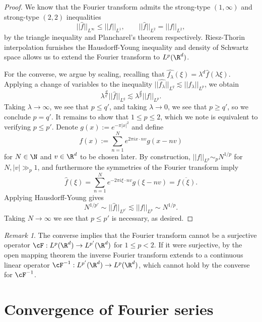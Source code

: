\documentclass[reqno]{amsart}
\theoremstyle{definition}
\theoremstyle{remark}
\newtheorem*{remark}{Remark}
\begin{document}
\begin{proof}
	We know that the Fourier transform admits the strong-type $(1, \infty)$ and strong-type $(2, 2)$ inequalities
		\[ ||\widehat f ||_{L^\infty} \leq ||f||_{L^1}, \qquad ||\widehat f||_{L^2} = ||f||_{L^2}, \]
	by the triangle inequality and Plancharel's theorem respectively. Riesz-Thorin interpolation furnishes the Hausdorff-Young inequality and density of Schwartz space allows us to extend the Fourier transform to $L^p (\R^d)$. 
	
	For the converse, we argue by scaling, recalling that $\widehat{f_\lambda} (\xi) = \lambda^d \widehat f (\lambda \xi)$. Applying a change of variables to the inequality $||\widehat{f_\lambda}||_{L^q} \lesssim ||f_\lambda||_{L^p}$, we obtain
		\[ \lambda^{\frac{d}{q'}} ||\widehat f||_{L^q}  \lesssim \lambda^{\frac{d}{p}} ||f||_{L^p}. \]
	Taking $\lambda \to \infty$, we see that $p \leq q'$, and taking $\lambda \to 0$, we see that $p \geq q'$, so we conclude $p = q'$. It remains to show that $1 \leq p \leq 2$, which we note is equivalent to verifying $p \leq p'$. Denote $g(x) := e^{-\pi |x|^2}$ and define
		\[ f(x) := \sum_{n = 1}^N e^{2\pi i x \cdot nv} g(x - n v) \]
	for $N \in \N$ and $v \in \R^d$ to be chosen later. By construction, $||f||_{L^p} \sim_p N^{1/p}$ for $N, |v| \gg_p 1$, and furthermore the symmetries of the Fourier transform imply
		\[ \widehat f(\xi) = \sum_{n = 1}^N e^{-2 \pi i \xi \cdot n v} g(\xi - nv) = \overline{f(\xi)}. \]
	Applying Hausdorff-Young gives
		\[ N^{1/p'} \sim ||\widehat f||_{L^{p'}} \lesssim ||f||_{L^p} \sim N^{1/p}. \]
	Taking $N \to \infty$ we see that $p \leq p'$ is necessary, as desired. 	
\end{proof}

\begin{remark}
	The converse implies that the Fourier transform cannot be a surjective operator $\cF : L^p (\R^d) \to L^{p'} (\R^d)$ for $1 \leq p < 2$. If it were surjective, by the open mapping theorem the inverse Fourier transform extends to a continuous linear operator $\cF^{-1} : L^{p'} (\R^d) \to L^p (\R^d)$, which cannot hold by the converse for $\cF^{-1}$. 
\end{remark}

\section{Convergence of Fourier series}
\end{document}
